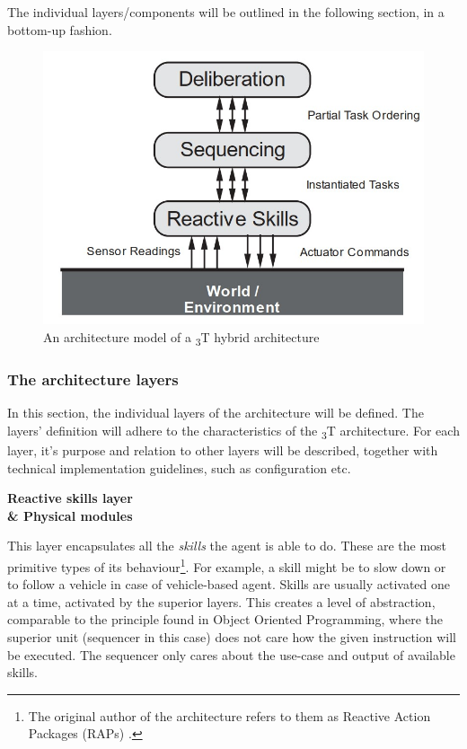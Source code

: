 \documentclass[main.tex]{subfiles}
\begin{document}
The individual layers/components will be outlined in the following section, in a bottom-up
fashion.

\begin{figure}[htbp]
    \centering
    \includegraphics[width=.8\textwidth]{3t-arch.jpg}
    \caption{An architecture model of a \textsubscript{3}T hybrid architecture \cite{Bonasso1995}}
    \label{3-arch2}
\end{figure}



\subsubsection{The architecture layers}

In this section, the individual layers of the architecture will be defined. The layers' definition will 
adhere to the characteristics of the \textsubscript{3}T architecture. For each layer, it's purpose and 
relation to other layers will be described, together with technical implementation guidelines, such as 
configuration etc.

\textbf{Reactive skills layer \\\& Physical modules}

This layer encapsulates all the \emph{skills} the agent is able to do. These are the 
most primitive types of its behaviour\footnote{The original author of the architecture refers to them 
as Reactive Action Packages (RAPs) \cite{Firby1987}.}. For example, a skill might be to slow
down or to follow a vehicle in case of vehicle-based agent. Skills are usually activated one at a time, 
activated by the superior layers. This creates a level of abstraction, comparable to the principle found 
in Object Oriented Programming, where the superior unit (sequencer in this case) does not care how the 
given instruction will be executed. The sequencer only cares about the use-case and output of available
skills. 
\end{document}

